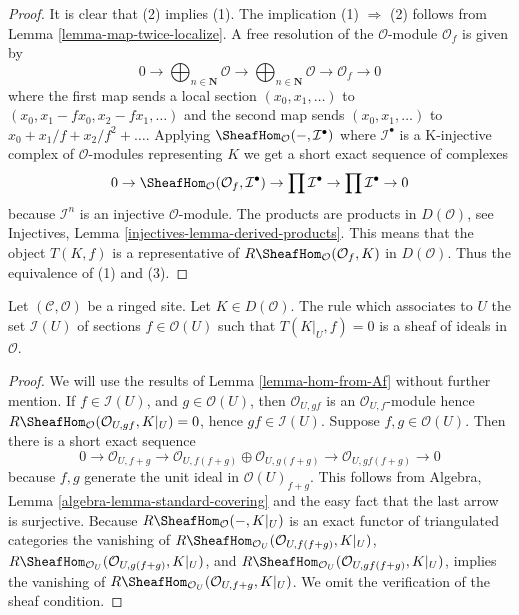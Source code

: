 \begin{proof}
It is clear that (2) implies (1). The implication (1) $\Rightarrow$ (2)
follows from Lemma \ref{lemma-map-twice-localize}.
A free resolution of the $\mathcal{O}$-module $\mathcal{O}_f$ is given by
$$
0 \to \bigoplus\nolimits_{n \in \mathbf{N}} \mathcal{O} \to
\bigoplus\nolimits_{n \in \mathbf{N}} \mathcal{O}
\to \mathcal{O}_f \to 0
$$
where the first map sends a local section $(x_0, x_1, \ldots)$ to
$(x_0, x_1 - fx_0, x_2 - fx_1, \ldots)$ and the second map sends
$(x_0, x_1, \ldots)$ to $x_0 + x_1/f + x_2/f^2 + \ldots$.
Applying $\SheafHom_\mathcal{O}(-, \mathcal{I}^\bullet)$
where $\mathcal{I}^\bullet$ is a K-injective complex of $\mathcal{O}$-modules
representing $K$ we get a short exact sequence of complexes
$$
0 \to \SheafHom_\mathcal{O}(\mathcal{O}_f, \mathcal{I}^\bullet) \to
\prod \mathcal{I}^\bullet \to \prod \mathcal{I}^\bullet \to 0
$$
because $\mathcal{I}^n$ is an injective $\mathcal{O}$-module.
The products are products in $D(\mathcal{O})$, see
Injectives, Lemma \ref{injectives-lemma-derived-products}.
This means that the object $T(K, f)$ is a representative of
$R\SheafHom_\mathcal{O}(\mathcal{O}_f, K)$ in $D(\mathcal{O})$.
Thus the equivalence of (1) and (3).
\end{proof}

\begin{lemma}
\label{lemma-ideal-of-elements-complete-wrt}
Let $(\mathcal{C}, \mathcal{O})$ be a ringed site. Let $K \in D(\mathcal{O})$.
The rule which associates to $U$ the set $\mathcal{I}(U)$
of sections $f \in \mathcal{O}(U)$ such that $T(K|_U, f) = 0$
is a sheaf of ideals in $\mathcal{O}$.
\end{lemma}

\begin{proof}
We will use the results of Lemma \ref{lemma-hom-from-Af} without further
mention. If $f \in \mathcal{I}(U)$, and $g \in \mathcal{O}(U)$, then
$\mathcal{O}_{U, gf}$ is an $\mathcal{O}_{U, f}$-module
hence $R\SheafHom_\mathcal{O}(\mathcal{O}_{U, gf}, K|_U) = 0$, hence
$gf \in \mathcal{I}(U)$. Suppose $f, g \in \mathcal{O}(U)$.
Then there is a short exact sequence
$$
0 \to \mathcal{O}_{U, f + g} \to
\mathcal{O}_{U, f(f + g)} \oplus \mathcal{O}_{U, g(f + g)} \to
\mathcal{O}_{U, gf(f + g)} \to 0
$$
because $f, g$ generate the unit ideal in $\mathcal{O}(U)_{f + g}$.
This follows from
Algebra, Lemma \ref{algebra-lemma-standard-covering}
and the easy fact that the last arrow is surjective.
Because $R\SheafHom_\mathcal{O}( - , K|_U)$ is an exact functor
of triangulated categories the vanishing of
$R\SheafHom_{\mathcal{O}_U}(\mathcal{O}_{U, f(f + g)}, K|_U)$,
$R\SheafHom_{\mathcal{O}_U}(\mathcal{O}_{U, g(f + g)}, K|_U)$, and
$R\SheafHom_{\mathcal{O}_U}(\mathcal{O}_{U, gf(f + g)}, K|_U)$,
implies the vanishing of 
$R\SheafHom_{\mathcal{O}_U}(\mathcal{O}_{U, f + g}, K|_U)$.
We omit the verification of the sheaf condition.
\end{proof}

